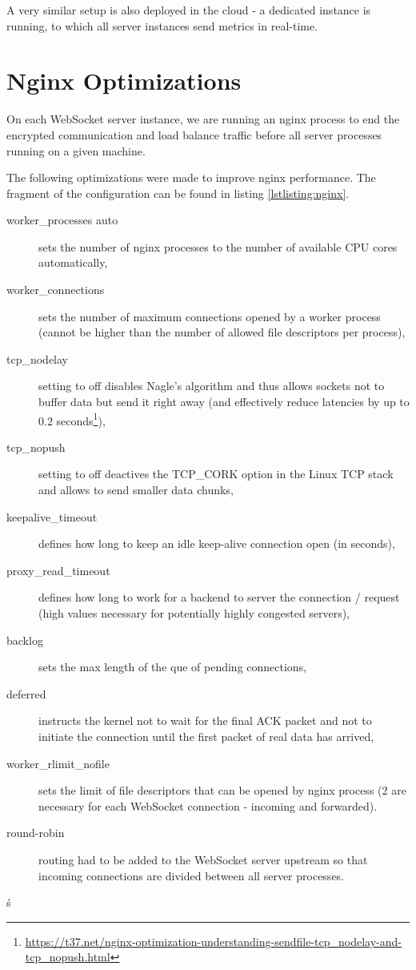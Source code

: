 \documentclass{uvamscse}
\begin{document}
A very similar setup is also deployed in the cloud - a dedicated instance is running, to which all server instances send metrics in real-time.

\section{Nginx Optimizations}
On each WebSocket server instance, we are running an nginx process to end the encrypted communication and load balance traffic before all server processes running on a given machine.

The following optimizations were made to improve nginx performance. The fragment of the configuration can be found in listing \ref{lstlisting:nginx}.

\begin{description}
  \item [worker\_processes auto] sets the number of nginx processes to the number of available CPU cores automatically,
  \item [worker\_connections] sets the number of maximum connections opened by a worker process (cannot be higher than the number of allowed file descriptors per process),
  \item [tcp\_nodelay] setting to off disables Nagle’s algorithm and thus allows sockets not to buffer data but send it right away (and effectively reduce latencies by up to 0.2 seconds\footnote{\url{https://t37.net/nginx-optimization-understanding-sendfile-tcp\_nodelay-and-tcp_nopush.html}}),
  \item [tcp\_nopush] setting to off deactives the TCP\_CORK option in the Linux TCP stack and allows to send smaller data chunks,
  \item [keepalive\_timeout] defines how long to keep an idle keep-alive connection open (in seconds),
  \item [proxy\_read\_timeout] defines how long to work for a backend to server the connection / request (high values necessary for potentially highly congested servers),
  \item [backlog] sets the max length of the que of pending connections,
  \item [deferred] instructs the kernel not to wait for the final ACK packet and not to initiate the connection until the first packet of real data has arrived,
  \item [worker\_rlimit\_nofile] sets the limit of file descriptors that can be opened by nginx process (2 are necessary for each WebSocket connection - incoming and forwarded).
  \item [round-robin] routing had to be added to the WebSocket server upstream so that incoming connections are divided between all server processes.
\end{description}ś
\end{document}

